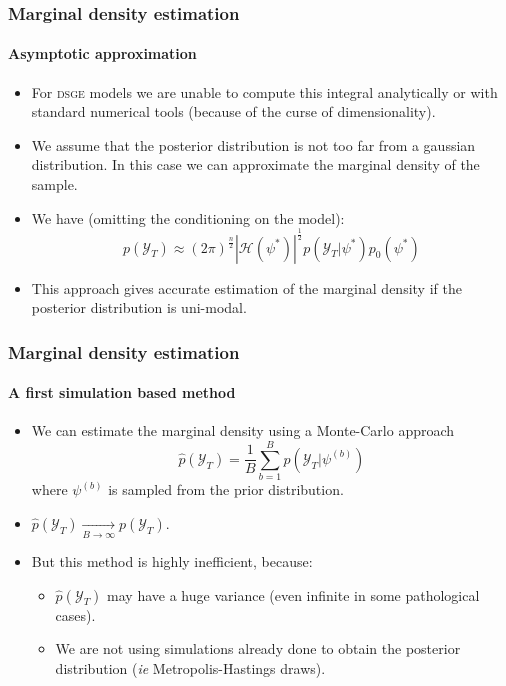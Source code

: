 \documentclass[10pt,slidestop]{beamer}
\newcommand{\sample}{\mathcal Y_T}
\begin{document}
\begin{frame}
  \frametitle{Marginal density estimation}
  \framesubtitle{Asymptotic approximation}

  \begin{itemize}

  \item For \textsc{dsge} models we are unable to compute this
    integral analytically or with standard numerical tools (because of
    the curse of dimensionality).

\bigskip

  \item We assume that the posterior distribution is not too far from
    a gaussian distribution. In this case we can approximate the
    marginal density of the sample.

\bigskip

  \item We have (omitting the conditioning on the model):
    \medskip
    \[
    p(\sample) \approx
    (2\pi)^{\frac{n}{2}}|\mathcal
    H(\psi^{\ast})|^{\frac{1}{2}}p(\sample|\psi^{\ast})
    p_0(\psi^{\ast})
    \]

\bigskip

  \item This approach gives accurate estimation of the marginal
  density if the posterior distribution is uni-modal.

\end{itemize}

\end{frame}


\begin{frame}
  \frametitle{Marginal density estimation}
  \framesubtitle{A first simulation based method}

  \begin{itemize}

  \item We can estimate the marginal density using a Monte-Carlo approach
    \[
    \widehat{p}(\sample) = \frac{1}{B}\sum_{b=1}^B
    p(\sample|\psi^{(b)})
    \]
    where $\psi^{(b)}$ is sampled from the prior distribution.

\bigskip

  \item $\widehat{p}(\sample)
    \underset{B\rightarrow\infty}{\longrightarrow}
    p(\sample)$.

\bigskip

  \item But this method is highly inefficient,
    because:
    \begin{itemize}
    \item $\widehat{p}(\sample)$
      may have a huge variance (even infinite in some pathological cases).
    \item We are not using simulations already done
      to obtain the posterior distribution (\textit{ie}
      Metropolis-Hastings draws).
    \end{itemize}
  \end{itemize}

\end{frame}
\end{document}
